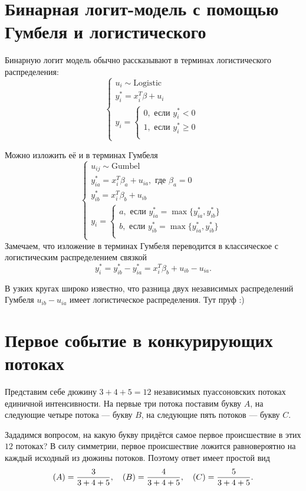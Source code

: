 \documentclass[12pt]{article}
\let\P\relax
\DeclareMathOperator{\P}{\mathbb{P}}
\newcommand{\dLogistic}{\mathrm{Logistic}}
\newcommand{\dGumbel}{\mathrm{Gumbel}}
\begin{document}
\section*{Бинарная логит-модель с помощью Гумбеля и логистического}

Бинарную логит модель обычно рассказывают в терминах логистического распределения:
\[
\begin{cases}
u_i \sim \dLogistic \\
y_i^* = x_i^T \beta + u_i \\
y_i =  \begin{cases}
0, \text{ если } y_i^* < 0 \\
1, \text{ если } y_i^* \geq 0 \\
\end{cases}
\end{cases}
\]

Можно изложить её и в терминах Гумбеля
\[
\begin{cases}
u_{ij} \sim \dGumbel \\
y_{ia}^* = x_i^T \beta_a + u_{ia}, \text{ где } \beta_a = 0 \\
y_{ib}^* = x_i^T \beta_b + u_{ib} \\
y_i = \begin{cases}
a, \text{ если } y_{ia}^* = \max\{y_{ia}^*, y_{ib}^*\} \\
b, \text{ если } y_{ib}^* = \max\{y_{ia}^*, y_{ib}^*\} \\
\end{cases}
\end{cases}
\]
Замечаем, что изложение в терминах Гумбеля переводится в классическое с логистическим распределением связкой
\[
y_i^* =y_{ib}^* - y_{ia}^* =  x_i^T \beta_b + u_{ib} - u_{ia}.
\]

В узких кругах широко известно, что разница двух независимых распределений Гумбеля $u_{ib} - u_{ia}$ имеет логистическое распределения.
Тут пруф :)


\section*{Первое событие в конкурирующих потоках}

Представим себе дюжину $3 + 4 + 5 = 12$ независимых пуассоновских потоках единичной интенсивности. 
На первые три потока поставим букву $A$, на следующие четыре потока — букву $B$, на следующие пять потоков — букву $C$.

Зададимся вопросом, на какую букву придётся самое первое происшествие в этих $12$ потоках?
В силу симметрии, первое происшествие ложится равновероятно на каждый исходный из дюжины потоков. 
Поэтому ответ имеет простой вид
\[
\P(A) = \frac{3}{3 + 4 + 5}, \quad \P(B) = \frac{4}{3 + 4 + 5}, \quad \P(C) = \frac{5}{3 + 4 + 5}.
\]
\end{document}
